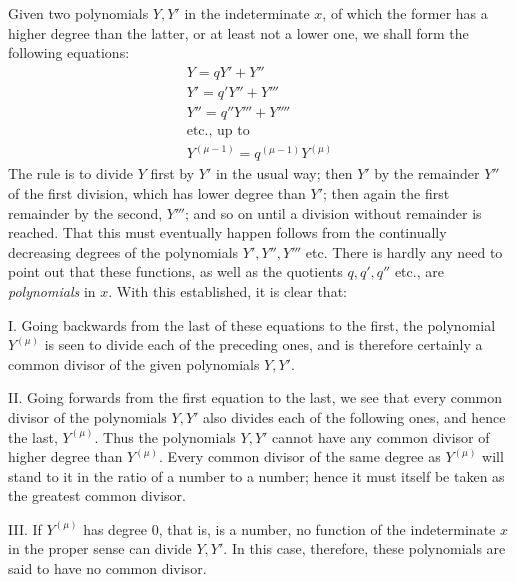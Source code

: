 Given two polynomials $Y,Y'$ in the indeterminate $x$, of which the former has a higher degree than the latter, or at least not a lower one, we shall form the following equations:
\[
\begin{gathered} Y=qY'+Y''\\ Y'=q'Y''+Y'''\\ Y''=q''Y'''+Y''''\\ \text{etc., up to}\\ Y^{(\mu-1)}=q^{(\mu-1)}Y^{(\mu)}
\end{gathered}
\]
The rule is to divide $Y$ first by $Y'$ in the usual way; then $Y'$ by the remainder $Y''$ of the first division, which has lower degree than $Y'$; then again the first remainder by the second, $Y'''$; and so on until a division without remainder is reached. That this must eventually happen follows from the continually decreasing degrees of the polynomials $Y',Y'',Y'''$ etc. There is hardly any need to point out that these functions, as well as the quotients $q,q',q''$ etc., are \textit{polynomials} in $x$. With this established, it is clear that:

I. Going backwards from the last of these equations to the first, the polynomial $Y^{(\mu)}$ is seen to divide each of the preceding ones, and is therefore certainly a common divisor of the given polynomials $Y,Y'$.

II. Going forwards from the first equation to the last, we see that every common divisor of the polynomials $Y,Y'$ also divides each of the following ones, and hence the last, $Y^{(\mu)}$. Thus the polynomials $Y,Y'$ cannot have any common divisor of higher degree than $Y^{(\mu)}$. Every common divisor of the same degree as $Y^{(\mu)}$ will stand to it in the ratio of a number to a number; hence it must itself be taken as the greatest common divisor.
\par
{}
III. If $Y^{(\mu)}$ has degree 0, that is, is a number, no function of the indeterminate $x$ in the proper sense can divide $Y,Y'$. In this case, therefore, these polynomials are said to have no common divisor.

